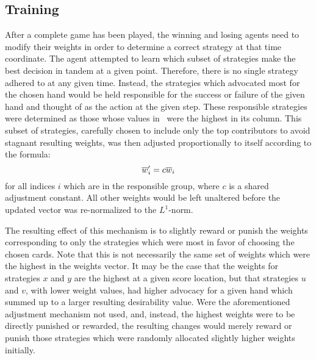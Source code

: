 
\subsection{Training}
\label{sec:dm-methods-training}



After a complete game has been played, the winning and losing agents need to
modify their weights in order to determine a correct strategy at that time
coordinate.
%
The agent attempted to learn which subset of strategies make the best
decision in tandem at a given point.
%
Therefore, there is no single strategy adhered to
at any given time.
%
Instead, the strategies which advocated most for the chosen hand would be held
responsible for the success or failure of the given hand and thought of as
the action at the given step.
%
These responsible strategies were determined as those whose
values in \Smat\ were the highest in its column.
%
This subset of strategies,
carefully chosen to include only the top contributors
to avoid stagnant resulting weights,
was then adjusted proportionally to itself according to the formula:
\[
	\overline{w}'_{i} = c \overline{w}_{i}
\]
for all indices $i$ which are in the responsible group,
where $c$ is a shared adjustment constant.
%
All other weights would be left unaltered
before the updated vector was re-normalized to the $L^1$-norm.

The resulting effect of this mechanism is to slightly reward or punish the weights
corresponding to only the strategies which were most in favor of choosing
the chosen cards.
%
Note that this is not necessarily the same set of weights which were the highest
in the weights vector.
%
It may be the case that the weights for strategies $x$ and $y$ are the highest
at a given score location,
but that strategies $u$ and $v$,
with lower weight values,
had higher advocacy for a given hand which summed up to a larger resulting
desirability value.
%
Were the aforementioned adjustment mechanism not used,
and, instead,
the highest weights were to be directly punished or rewarded,
the resulting changes would merely reward or punish those strategies which
were randomly allocated slightly higher weights initially.

